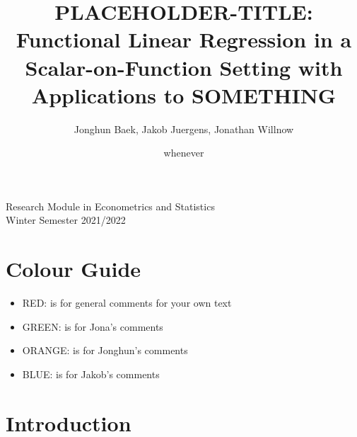 \documentclass[11pt,twoside,a4paper]{article}
\begin{document}
	\title{{\LARGE {\color{red}PLACEHOLDER-TITLE:} Functional Linear Regression in a Scalar-on-Function Setting with Applications to SOMETHING}}
	\author{Jonghun Baek, Jakob Juergens, Jonathan Willnow}
	\date{{\color{red}whenever}}
	\maketitle
	\vspace{1.5 cm}
	\begin{center}
		Research Module in Econometrics and Statistics \\
		Winter Semester 2021/2022
	\end{center}
	
	\newpage
	
	\tableofcontents
	
	\newpage
	
	\section{Colour Guide}
		\begin{itemize}
			\item {\color{red} RED}: is for general comments for your own text
			\item {\color{green} GREEN}: is for Jona's comments
			\item {\color{orange} ORANGE}: is for Jonghun's comments
			\item {\color{blue} BLUE}: is for Jakob's comments
		\end{itemize}
	
	\section{Introduction}
	
\end{document}

